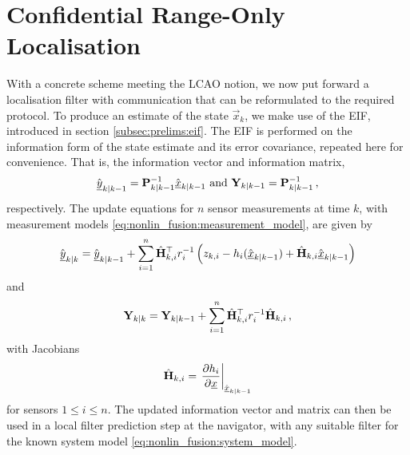 \section{Confidential Range-Only Localisation}\label{sec:nonlin_fusion:conf_range_only_localisation}
With a concrete scheme meeting the LCAO notion, we now put forward a localisation filter with communication that can be reformulated to the required protocol. To produce an estimate of the state $\vec{x}_k$, we make use of the EIF, introduced in section \ref{subsec:prelims:eif}. The EIF is performed on the information form of the state estimate and its error covariance, repeated here for convenience. That is, the information vector and information matrix,
\begin{equation}\label{eq:nonlin_fusion:eif_info_vec_info_mat}
    \hat{{\underline{y}}}_{k|k-1} = {{\mathbf{P}}}_{k|k-1}^{-1}\hat{{\underline{x}}}_{k|k-1} \text{ and } {\ensuremath{{\mathbf{Y}}}}_{k|k-1} = {{\mathbf{P}}}_{k|k-1}^{-1}\,,
\end{equation}
respectively. The update equations for $n$ sensor measurements at time $k$, with measurement models \eqref{eq:nonlin_fusion:measurement_model}, are given by
\begin{equation}\label{eq:nonlin_fusion:eif_info_vec_update}
        \hat{{\underline{y}}}_{k|k} = \hat{{\underline{y}}}_{k|k-1} +  \sum^n_{i=1}\hat{{{\mathbf{H}}}}^\top_{k,i} r^{-1}_i \left(z_{k,i} - h_i(\hat{{\underline{x}}}_{k|k-1}) + \hat{{{\mathbf{H}}}}_{k,i}\hat{{\underline{x}}}_{k|k-1}\right)
\end{equation}
and
\begin{equation}\label{eq:nonlin_fusion:eif_info_mat_update}
    {\ensuremath{{\mathbf{Y}}}}_{k|k} = {{\mathbf{Y}}}_{k|k-1} + \sum^n_{i=1}\hat{{{\mathbf{H}}}}^\top_{k,i} r^{-1}_i \hat{{{\mathbf{H}}}}_{k,i}\,,
\end{equation}
with Jacobians
\begin{equation}\label{eq:nonlin_fusion:measurement_jacobian}
    \hat{{{\mathbf{H}}}}_{k,i} = \left.\frac{\partial h_i}{\partial {\underline{x}}}\right|_{\hat{{\underline{x}}}_{k|k-1}}
\end{equation}
for sensors $1\leq i\leq n$. The updated information vector and matrix can then be used in a local filter prediction step at the navigator, with any suitable filter for the known system model \eqref{eq:nonlin_fusion:system_model}.

